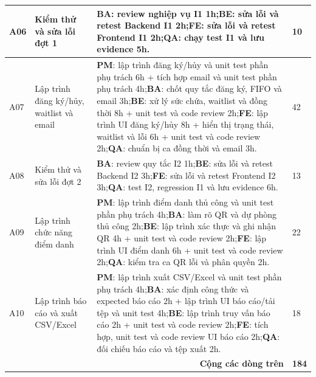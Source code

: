 \begin{table}[H]
\begin{tabularx}{\linewidth}{|p{0.8cm}|p{2.8cm}|>{\raggedright\arraybackslash}X|p{0.9cm}|}
A06 & Kiểm thử và sửa lỗi đợt 1 & \textbf{BA}: review nghiệp vụ I1 1h;\newline \textbf{BE}: sửa lỗi và retest Backend I1 2h;\newline \textbf{FE}: sửa lỗi và retest Frontend I1 2h;\newline \textbf{QA}: chạy test I1 và lưu evidence 5h. & 10 \\ \hline
A07 & Lập trình đăng ký/hủy, waitlist và email & \textbf{PM}: lập trình đăng ký/hủy và unit test phần phụ trách 6h + tích hợp email và unit test phần phụ trách 4h;\newline \textbf{BA}: chốt quy tắc đăng ký, FIFO và email 3h;\newline \textbf{BE}: xử lý sức chứa, waitlist và đồng thời 8h + unit test và code review 2h;\newline \textbf{FE}: lập trình UI đăng ký/hủy 8h + hiển thị trạng thái, waitlist và lỗi 6h + unit test và code review 2h;\newline \textbf{QA}: chuẩn bị ca đồng thời và email 3h. & 42 \\ \hline
A08 & Kiểm thử và sửa lỗi đợt 2 & \textbf{BA}: review quy tắc I2 1h;\newline \textbf{BE}: sửa lỗi và retest Backend I2 3h;\newline \textbf{FE}: sửa lỗi và retest Frontend I2 3h;\newline \textbf{QA}: test I2, regression I1 và lưu evidence 6h. & 13 \\ \hline
A09 & Lập trình chức năng điểm danh & \textbf{PM}: lập trình điểm danh thủ công và unit test phần phụ trách 4h;\newline \textbf{BA}: làm rõ QR và dự phòng thủ công 2h;\newline \textbf{BE}: lập trình xác thực và ghi nhận QR 4h + unit test và code review 2h;\newline \textbf{FE}: lập trình UI điểm danh 6h + unit test và code review 2h;\newline \textbf{QA}: kiểm tra ca QR lỗi và phân quyền 2h. & 22 \\ \hline
A10 & Lập trình báo cáo và xuất CSV/Excel & \textbf{PM}: lập trình xuất CSV/Excel và unit test phần phụ trách 4h;\newline \textbf{BA}: xác định công thức và expected báo cáo 2h + lập trình UI báo cáo/tải tệp và unit test 4h;\newline \textbf{BE}: lập trình truy vấn báo cáo 2h + unit test và code review 2h;\newline \textbf{FE}: tích hợp, unit test và code review UI báo cáo 2h;\newline \textbf{QA}: đối chiếu báo cáo và tệp xuất 2h. & 18 \\ \hline
\multicolumn{3}{|r|}{\textbf{Cộng các dòng trên}} & \textbf{184} \\ \hline
\end{tabularx}
\end{table}

